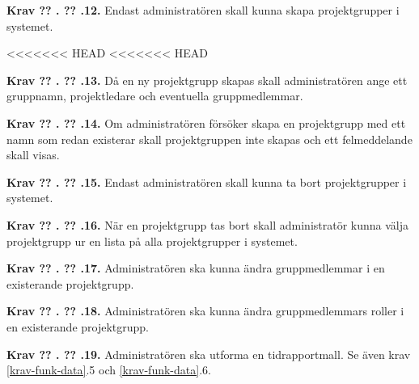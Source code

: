 \documentclass[a4paper]{article}
\newcommand\getcurrentref[1]{%
 \ifnumequal{\value{#1}}{0}
  {??}
  {\the\value{#1}}%
}
\newcommand\requirement[2]{
	\numberedrow{Krav}{#1}{#2}
}
\newcommand\numberedrow[3]{
	\noindent
	\textbf{#1 \getcurrentref{section}.\getcurrentref{subsection}.#2.} #3
	
}
\begin{document}
\requirement{12}{Endast administratören skall kunna skapa projektgrupper i systemet.}
<<<<<<< HEAD
<<<<<<< HEAD
\requirement{13}{Då en ny projektgrupp skapas skall administratören ange ett gruppnamn, projektledare och eventuella gruppmedlemmar.}
\requirement{14}{Om administratören försöker skapa en projektgrupp med ett namn som redan existerar skall projektgruppen inte skapas och ett felmeddelande skall visas.}
\requirement{15}{Endast administratören skall kunna ta bort projektgrupper i systemet.}
\requirement{16}{När en projektgrupp tas bort skall administratör kunna välja projektgrupp ur en lista på alla projektgrupper i systemet.}
\requirement{17}{Administratören ska kunna ändra gruppmedlemmar i en existerande projektgrupp.}
\requirement{18}{Administratören ska kunna ändra gruppmedlemmars roller i en existerande projektgrupp.}
\requirement{19}{Administratören ska utforma en tidrapportmall. Se även krav \ref{krav-funk-data}.5 och \ref{krav-funk-data}.6.}


\end{document}
